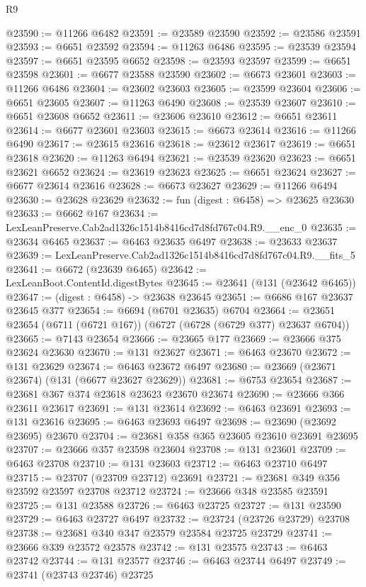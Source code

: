 \begin{lexlean}{R9}
\begin{coremodule}
@23590 := @11266 @6482
@23591 := @23589 @23590
@23592 := @23586 @23591
@23593 := @6651 @23592
@23594 := @11263 @6486
@23595 := @23539 @23594
@23597 := @6651 @23595 @6652
@23598 := @23593 @23597
@23599 := @6651 @23598
@23601 := @6677 @23588 @23590
@23602 := @6673 @23601
@23603 := @11266 @6486
@23604 := @23602 @23603
@23605 := @23599 @23604
@23606 := @6651 @23605
@23607 := @11263 @6490
@23608 := @23539 @23607
@23610 := @6651 @23608 @6652
@23611 := @23606 @23610
@23612 := @6651 @23611
@23614 := @6677 @23601 @23603
@23615 := @6673 @23614
@23616 := @11266 @6490
@23617 := @23615 @23616
@23618 := @23612 @23617
@23619 := @6651 @23618
@23620 := @11263 @6494
@23621 := @23539 @23620
@23623 := @6651 @23621 @6652
@23624 := @23619 @23623
@23625 := @6651 @23624
@23627 := @6677 @23614 @23616
@23628 := @6673 @23627
@23629 := @11266 @6494
@23630 := @23628 @23629
@23632 := fun (digest : @6458) => @23625 @23630
@23633 := @6662 @167
@23634 := LexLeanPreserve.Cab2ad1326c1514b8416cd7d8fd767c04.R9.__enc_0
@23635 := @23634 @6465
@23637 := @6463 @23635 @6497
@23638 := @23633 @23637
@23639 := LexLeanPreserve.Cab2ad1326c1514b8416cd7d8fd767c04.R9.__fits_5
@23641 := @6672 (@23639 @6465)
@23642 := LexLeanBoot.ContentId.digestBytes
@23645 := @23641 (@131 (@23642 @6465))
@23647 := (digest : @6458) -> @23638 @23645
@23651 := @6686 @167 @23637 @23645 @377
@23654 := @6694 (@6701 @23635) @6704
@23664 := @23651 @23654 (@6711 (@6721 @167)) (@6727 (@6728 (@6729 @377) @23637 @6704))
@23665 := @7143 @23654
@23666 := @23665 @177
@23669 := @23666 @375 @23624 @23630
@23670 := @131 @23627
@23671 := @6463 @23670
@23672 := @131 @23629
@23674 := @6463 @23672 @6497
@23680 := @23669 (@23671 @23674) (@131 (@6677 @23627 @23629))
@23681 := @6753 @23654
@23687 := @23681 @367 @374 @23618 @23623 @23670 @23674
@23690 := @23666 @366 @23611 @23617
@23691 := @131 @23614
@23692 := @6463 @23691
@23693 := @131 @23616
@23695 := @6463 @23693 @6497
@23698 := @23690 (@23692 @23695) @23670
@23704 := @23681 @358 @365 @23605 @23610 @23691 @23695
@23707 := @23666 @357 @23598 @23604
@23708 := @131 @23601
@23709 := @6463 @23708
@23710 := @131 @23603
@23712 := @6463 @23710 @6497
@23715 := @23707 (@23709 @23712) @23691
@23721 := @23681 @349 @356 @23592 @23597 @23708 @23712
@23724 := @23666 @348 @23585 @23591
@23725 := @131 @23588
@23726 := @6463 @23725
@23727 := @131 @23590
@23729 := @6463 @23727 @6497
@23732 := @23724 (@23726 @23729) @23708
@23738 := @23681 @340 @347 @23579 @23584 @23725 @23729
@23741 := @23666 @339 @23572 @23578
@23742 := @131 @23575
@23743 := @6463 @23742
@23744 := @131 @23577
@23746 := @6463 @23744 @6497
@23749 := @23741 (@23743 @23746) @23725

\end{coremodule}
\end{lexlean}
